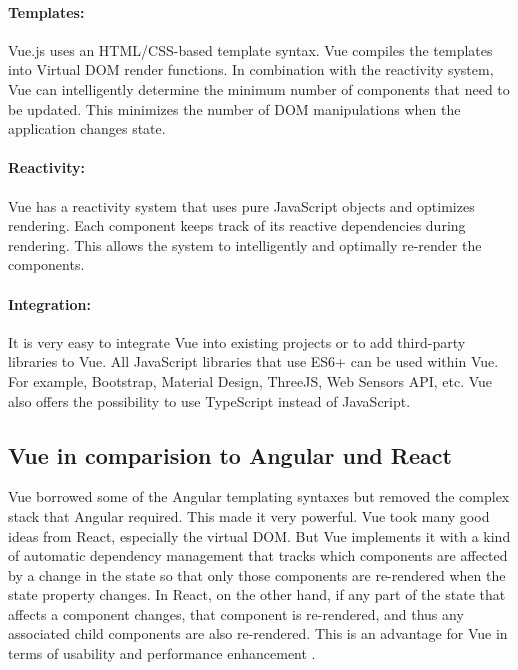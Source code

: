 	\paragraph*{Templates:} Vue.js uses an HTML/\gls{CSS}-based template syntax. Vue compiles the templates into Virtual DOM render functions. In combination with the reactivity system, Vue can intelligently determine the minimum number of components that need to be updated. This minimizes the number of DOM manipulations when the application changes state.
	\paragraph*{Reactivity:} Vue has a reactivity system that uses pure JavaScript objects and optimizes rendering. Each component keeps track of its reactive dependencies during rendering. This allows the system to intelligently and optimally re-render the components.
	\paragraph*{Integration:} It is very easy to integrate Vue into existing projects or to add third-party libraries to Vue. All JavaScript libraries that use ES6+ can be used within Vue. For example, Bootstrap, Material Design, ThreeJS, Web Sensors API, etc.  Vue also offers the possibility to use TypeScript instead of JavaScript.
	\cite{VueGuide:Online}


	\subsection{Vue in comparision to Angular und React}
	\label{sec:VueAngularReact}
	Vue borrowed some of the Angular templating syntaxes but removed the complex stack that Angular required. This made it very powerful. Vue took many good ideas from React, especially the virtual DOM.  But Vue implements it with a kind of automatic dependency management that tracks which components are affected by a change in the state so that only those components are re-rendered when the state property changes. In React, on the other hand, if any part of the state that affects a component changes, that component is re-rendered, and thus any associated child components are also re-rendered. This is an advantage for Vue in terms of usability and performance enhancement \cite{VueComparision:Online}.

